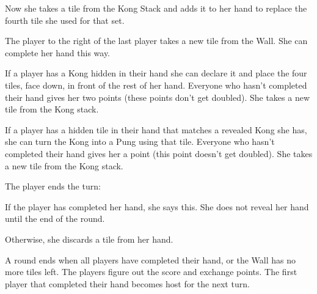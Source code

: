 \documentclass{article}
\begin{document}
\begin{enumerate*}
\begin{enumerate*}
        Now she takes a tile from the Kong Stack and adds it to her hand to replace the fourth tile she used for that set.
        \item The player to the right of the last player takes a new tile from the Wall. She can complete her hand this way.
    \end{enumerate*}
    \item If a player has a Kong hidden in their hand she can declare it and place the four tiles, face down, in front of the rest of her hand.
    Everyone who hasn't completed their hand gives her two points (these points don't get doubled).
    She takes a new tile from the Kong stack.
    \item If a player has a hidden tile in their hand that matches a revealed Kong she has, she can turn the Kong into a Pung using that tile.
    Everyone who hasn't completed their hand gives her a point (this point doesn't get doubled).
    She takes a new tile from the Kong stack.
    \item The player ends the turn:
        \begin{enumerate*}
            \item If the player has completed her hand, she says this. She does not reveal her hand until the end of the round.
            \item Otherwise, she discards a tile from her hand.
        \end{enumerate*}
\end{enumerate*}

A round ends when all players have completed their hand, or the Wall has no more tiles left. The players figure out the score and exchange points. The first player that completed their hand becomes host for the next turn.
\end{document}
